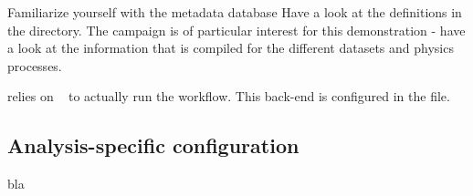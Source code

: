 \begin{exercise}{Familiarize yourself with the metadata database}
	Have a look at the definitions in the  directory.
	The campaign  is of particular interest for this demonstration - have a look at the information that is compiled for the different datasets and physics processes.
\end{exercise}

\columnflow relies on ~\cite{law} to actually run the workflow.
This back-end is configured in the  file.




\subsection{Analysis-specific configuration}
bla


